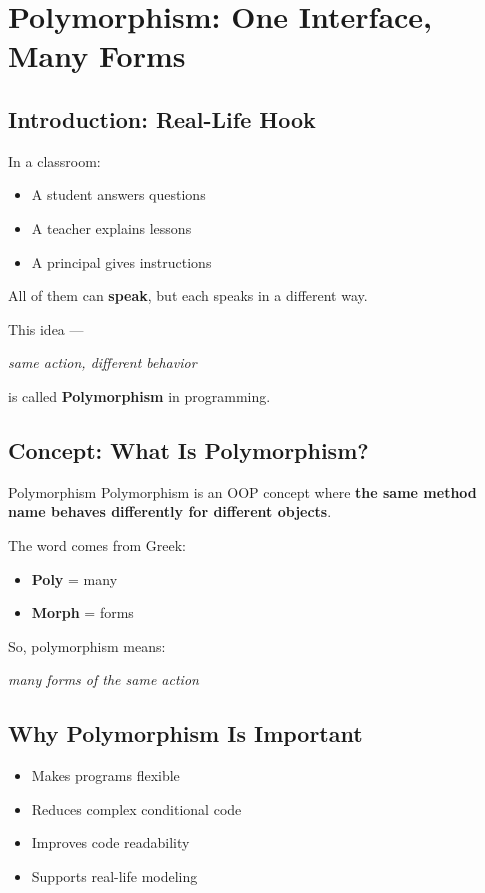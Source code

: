 \chapter{Polymorphism: One Interface, Many Forms}

\section{Introduction: Real-Life Hook}

In a classroom:
\begin{itemize}
    \item A student answers questions
    \item A teacher explains lessons
    \item A principal gives instructions
\end{itemize}

All of them can \textbf{speak}, but each speaks in a different way.

This idea —
\begin{center}
\textit{same action, different behavior}
\end{center}

is called \textbf{Polymorphism} in programming.

\section{Concept: What Is Polymorphism?}

\begin{definition}{Polymorphism}
Polymorphism is an OOP concept where \textbf{the same method name behaves differently for different objects}.
\end{definition}

The word comes from Greek:
\begin{itemize}
    \item \textbf{Poly} = many
    \item \textbf{Morph} = forms
\end{itemize}

So, polymorphism means:
\begin{center}
\textit{many forms of the same action}
\end{center}

\section{Why Polymorphism Is Important}

\begin{itemize}
    \item Makes programs flexible
    \item Reduces complex conditional code
    \item Improves code readability
    \item Supports real-life modeling
\end{itemize}

